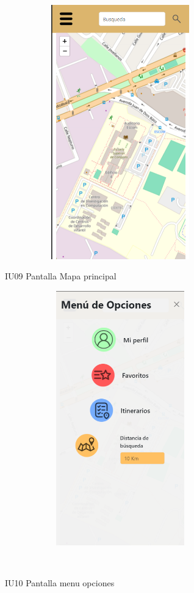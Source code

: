 \begin{figure}[htb]
    \begin{minipage}{1\textwidth}
    \centering
    \includegraphics[width=10cm, height=11cm]{entregable final/pantallasSistema/IU09 Pantalla Mapa principal.png}
    \caption{IU09 Pantalla Mapa principal}
\end{minipage}

    \begin{minipage}{1\textwidth}
        \centering
        \includegraphics[width=10cm, height=11cm]{entregable final/pantallasSistema/IU10 Pantalla menu opciones.png}
        \caption{IU10 Pantalla menu opciones}
    \end{minipage}
    \\
\end{figure}
